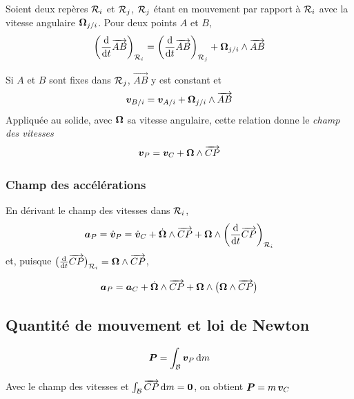 \begin{theoreme}
    Soient deux repères $\mathcal{R}_{i}$ et $\mathcal{R}_{j}$, $\mathcal{R}_{j}$ étant en
    mouvement par rapport à $\mathcal{R}_{i}$ avec la vitesse angulaire
    $\bm{\Omega}_{j/i}$. Pour deux points $A$ et $B$,
    \[
        \left(\frac{\mathrm{d}}{\mathrm{d} t}\overrightarrow{AB}\right)_{\mathcal{R}_{i}}
        = \left(\frac{\mathrm{d}}{\mathrm{d} t}\overrightarrow{AB}\right)_{\mathcal{R}_{j}}
        + \bm{\Omega}_{j/i}\wedge\overrightarrow{AB}
    \]
\end{theoreme}

Si $A$ et $B$ sont fixes dans $\mathcal{R}_{j}$, $\overrightarrow{AB}$ y est
constant et
\[
    \bm{v}_{B/i} = \bm{v}_{A/i}
    + \bm{\Omega}_{j/i}\wedge\overrightarrow{AB}
\]
Appliquée au solide, avec $\bm{\Omega}$ sa vitesse angulaire, cette
relation donne le \emph{champ des vitesses}
\[
    \bm{v}_P = \bm{v}_C + \bm{\Omega}\wedge\overrightarrow{CP}
\]

\subsubsection{Champ des accélérations}

En dérivant le champ des vitesses dans $\mathcal{R}_{i}$,
\[
    \bm{a}_P = \dot{\bm{v}}_P
    = \dot{\bm{v}}_C
    + \dot{\bm{\Omega}}\wedge\overrightarrow{CP}
    + \bm{\Omega}\wedge
    \left(\frac{\mathrm{d}}{\mathrm{d} t}\overrightarrow{CP}\right)_{\mathcal{R}_{i}}
\]
et, puisque $\bigl(\frac{\mathrm{d}}{\mathrm{d} t}\overrightarrow{CP}\bigr)_{\mathcal{R}_{i}}
= \bm{\Omega}\wedge\overrightarrow{CP}$,

\begin{proposition}
    \[
        \bm{a}_P = \bm{a}_C
        + \dot{\bm{\Omega}}\wedge\overrightarrow{CP}
        + \bm{\Omega}\wedge\bigl(\bm{\Omega}\wedge
        \overrightarrow{CP}\bigr)
    \]
\end{proposition}

\subsection{Quantité de mouvement et loi de Newton}

\begin{definition}
    \[
        \bm{P} = \int_{\mathcal{B}} \bm{v}_P\,\mathrm{d} m
    \]
\end{definition}

Avec le champ des vitesses et $\int_{\mathcal{B}}\overrightarrow{CP}\,
\mathrm{d} m = \bm{0}$, on obtient $\bm{P} = m\,\bm{v}_C$

